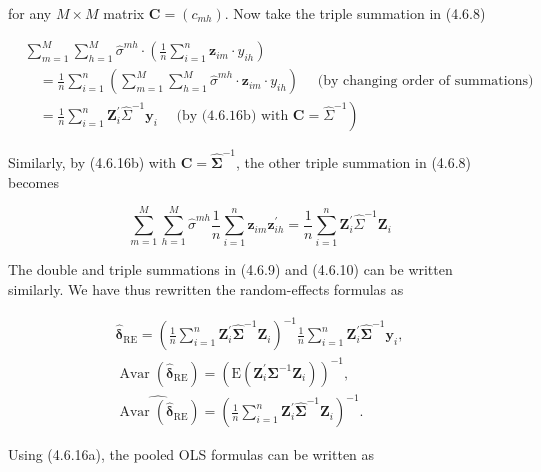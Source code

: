 \documentclass[10pt]{article}
\begin{document}
for any $M \times M$ matrix $\mathbf{C}=\left(c_{m h}\right)$. Now take the triple summation in (4.6.8)


\begin{align*}
& \sum_{m=1}^{M} \sum_{h=1}^{M} \hat{\sigma}^{m h} \cdot\left(\frac{1}{n} \sum_{i=1}^{n} \mathbf{z}_{i m} \cdot y_{i h}\right) \\
& \quad=\frac{1}{n} \sum_{i=1}^{n}\left(\sum_{m=1}^{M} \sum_{h=1}^{M} \hat{\sigma}^{m h} \cdot \mathbf{z}_{i m} \cdot y_{i h}\right) \quad \text { (by changing order of summations) } \\
& \left.\quad=\frac{1}{n} \sum_{i=1}^{n} \mathbf{Z}_{i}^{\prime} \widehat{\Sigma}^{-1} \mathbf{y}_{i} \quad \text { (by (4.6.16b) with } \mathbf{C}=\widehat{\Sigma}^{-1}\right) \tag{4.6.17}
\end{align*}


Similarly, by (4.6.16b) with $\mathbf{C}=\widehat{\mathbf{\Sigma}}^{-1}$, the other triple summation in (4.6.8) becomes


\begin{equation*}
\sum_{m=1}^{M} \sum_{h=1}^{M} \hat{\sigma}^{m h} \frac{1}{n} \sum_{i=1}^{n} \mathbf{z}_{i m} \mathbf{z}_{i h}^{\prime}=\frac{1}{n} \sum_{i=1}^{n} \mathbf{Z}_{i}^{\prime} \hat{\Sigma}^{-1} \mathbf{Z}_{i} \tag{4.6.18}
\end{equation*}


The double and triple summations in (4.6.9) and (4.6.10) can be written similarly. We have thus rewritten the random-effects formulas as


\begin{gather*}
\hat{\boldsymbol{\delta}}_{\mathrm{RE}}=\left(\frac{1}{n} \sum_{i=1}^{n} \mathbf{Z}_{i}^{\prime} \widehat{\mathbf{\Sigma}}^{-1} \mathbf{Z}_{i}\right)^{-1} \frac{1}{n} \sum_{i=1}^{n} \mathbf{Z}_{i}^{\prime} \widehat{\mathbf{\Sigma}}^{-1} \mathbf{y}_{i},  \tag{$\prime$}\\
\operatorname{Avar}\left(\hat{\boldsymbol{\delta}}_{\mathrm{RE}}\right)=\left(\mathrm{E}\left(\mathbf{Z}_{i}^{\prime} \mathbf{\Sigma}^{-1} \mathbf{Z}_{i}\right)\right)^{-1},  \tag{$\prime$}\\
\widehat{\operatorname{Avar}\left(\hat{\boldsymbol{\delta}}_{\mathrm{RE}}\right)}=\left(\frac{1}{n} \sum_{i=1}^{n} \mathbf{Z}_{i}^{\prime} \widehat{\mathbf{\Sigma}}^{-1} \mathbf{Z}_{i}\right)^{-1} . \tag{4.6.10'}
\end{gather*}


Using (4.6.16a), the pooled OLS formulas can be written as
\end{document}
